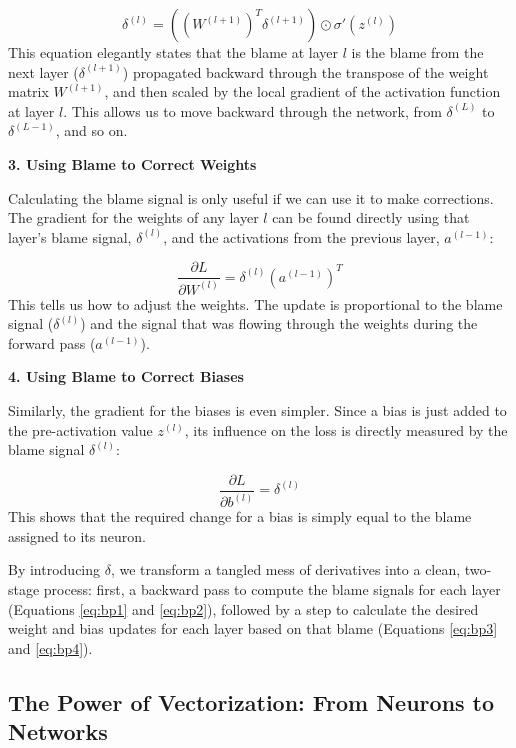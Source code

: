 \documentclass{article}
\begin{document}
\begin{equation}
    \delta^{(l)} = \left( (W^{(l+1)})^T \delta^{(l+1)} \right) \odot \sigma'(z^{(l)}) \label{eq:bp2}
\end{equation}
This equation elegantly states that the blame at layer $l$ is the blame from the next layer ($\delta^{(l+1)}$) propagated backward through the transpose of the weight matrix $W^{(l+1)}$, and then scaled by the local gradient of the activation function at layer $l$. This allows us to move backward through the network, from $\delta^{(L)}$ to $\delta^{(L-1)}$, and so on.

\textbf{3. Using Blame to Correct Weights}

Calculating the blame signal is only useful if we can use it to make corrections. The gradient for the weights of any layer $l$ can be found directly using that layer's blame signal, $\delta^{(l)}$, and the activations from the previous layer, $a^{(l-1)}$:

\begin{equation}
    \frac{\partial L}{\partial W^{(l)}} = \delta^{(l)} (a^{(l-1)})^T \label{eq:bp3}
\end{equation}
This tells us how to adjust the weights. The update is proportional to the blame signal ($\delta^{(l)}$) and the signal that was flowing through the weights during the forward pass ($a^{(l-1)}$).

\textbf{4. Using Blame to Correct Biases}

Similarly, the gradient for the biases is even simpler. Since a bias is just added to the pre-activation value $z^{(l)}$, its influence on the loss is directly measured by the blame signal $\delta^{(l)}$:

\begin{equation}
    \frac{\partial L}{\partial b^{(l)}} = \delta^{(l)} \label{eq:bp4}
\end{equation}
This shows that the required change for a bias is simply equal to the blame assigned to its neuron.

By introducing $\delta$, we transform a tangled mess of derivatives into a clean, two-stage process: first, a backward pass to compute the blame signals for each layer (Equations \ref{eq:bp1} and \ref{eq:bp2}), followed by a step to calculate the desired weight and bias updates for each layer based on that blame (Equations \ref{eq:bp3} and \ref{eq:bp4}).



\subsection{The Power of Vectorization: From Neurons to Networks}
\end{document}
